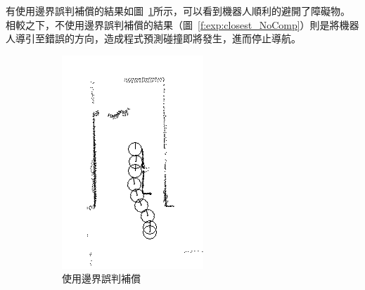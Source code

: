 有使用邊界誤判補償的結果如圖~\ref{f:exp:closest_Comp}所示，可以看到機器人順利的避開了障礙物。
相較之下，不使用邊界誤判補償的結果（圖~\ref{f:exp:closest_NoComp}）則是將機器人導引至錯誤的方向，造成程式預測碰撞即將發生，進而停止導航。
\begin{figure}[h!]
	\centering
	\begin{subfigure}[t]{0.48\textwidth}
		\includegraphics[width=\textwidth]{figures/experiments/path_closest_Comp}
		\caption{使用邊界誤判補償}
		\label{f:exp:closest_Comp}
	\end{subfigure}
	\begin{subfigure}[t]{0.48\textwidth}

\end{subfigure}
\end{figure}
